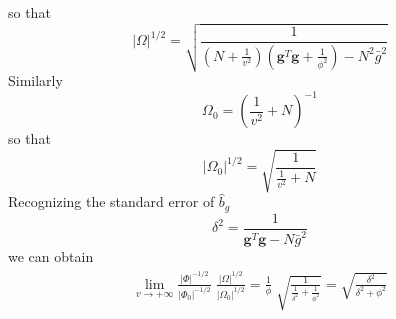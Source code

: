 \documentclass[10pt]{article}
\begin{document}
so that
\[
|\Omega|^{1/2} = \sqrt{\frac{1}{(N + \frac{1}{v^2}) (\bm{g}^T \bm{g} + \frac{1}{\phi^2}) - N^2 \bar{g}^2}}
\]
Similarly
\[
\Omega_0 = \left( \frac{1}{v^2} + N \right)^{-1}
\]
so that
\[
|\Omega_0|^{1/2} = \sqrt{\frac{1}{\frac{1}{v^2} + N}}
\]
Recognizing the standard error of $\hat{b}_g$
\[
\delta^2 = \frac{1}{\bm{g}^T \bm{g} - N \bar{g}^2}
\]
we can obtain
\begin{equation}
  \begin{aligned}
    \underset{v \to +\infty}{\lim} \frac{|\Phi|^{-1/2}}{|\Phi_0|^{-1/2}} \; \frac{|\Omega|^{1/2}}{|\Omega_0|^{1/2}} = \frac{1}{\phi} \; \sqrt{\frac{1}{\frac{1}{\delta^2} + \frac{1}{\phi^2}}} = \sqrt{\frac{\delta^2}{\delta^2 + \phi^2}}
  \end{aligned}
\end{equation}
\end{document}
